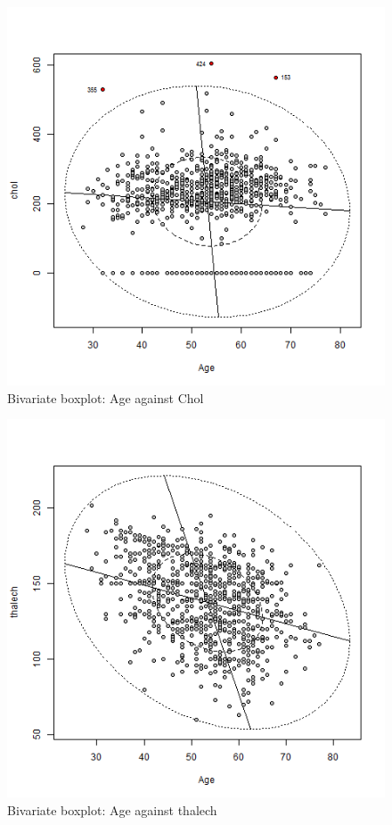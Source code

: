 \documentclass[a4paper]{article}
\begin{document}
\begin{figure}[H]
	\begin{center}
		\includegraphics[width=12cm]{intro files/intplot3.png}
	\end{center}
	\caption{Bivariate boxplot: Age against Chol}
\end{figure}

\begin{figure}[H]
	\begin{center}
		\includegraphics[width=12cm]{intro files/intplot4.png}
	\end{center}
	\caption{Bivariate boxplot: Age against thalech}
\end{figure}
\end{document}
